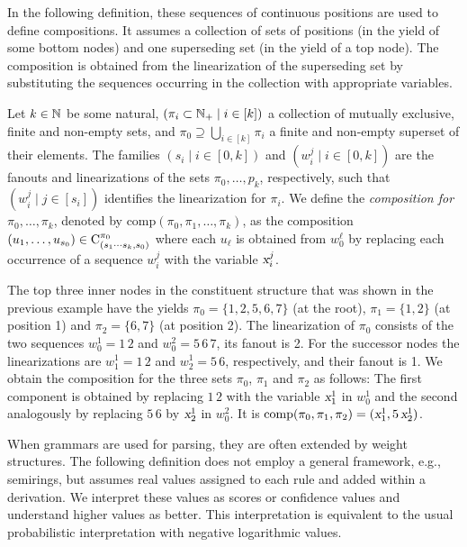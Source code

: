 \documentclass[../../document.tex]{subfiles}
\begin{document}
    In the following definition, these sequences of continuous positions are used to define  compositions.
    It assumes a collection of sets of positions (in the yield of some bottom nodes) and one superseding set (in the yield of a top node).
    The composition is obtained from the linearization of the superseding set by substituting the sequences occurring in the collection with appropriate variables.

    \begin{definition}
        Let \(k \in \mathbb{N}\) be some natural, \((\pi_i \subset \mathbb{N}_+ \mid i \in [k])\) a collection of mutually exclusive, finite and non-empty sets, and \(\pi_0 \supseteq \bigcup_{i \in [k]} \pi_i\) a finite and non-empty superset of their elements.
        The families \((s_i \mid i \in [0,k])\) and \((w_i^j \mid i \in [0,k])\) are the fanouts and linearizations of the sets \(\pi_0, \ldots, p_k\), respectively, such that \((w_i^j \mid j \in [s_i])\) identifies the linearization for \(\pi_i\).
        We define the \emph{composition for \(\pi_0, \ldots, \pi_k\)}, denoted by \(\mathrm{comp}(\pi_0, \pi_1, \ldots, \pi_k)\), as the composition \((u_1, \ldots, u_{s_0}) \in \mathrm{C}^{\pi_0}_{(s_1\cdots s_k, s_0)}\) where each \(u_\ell\) is obtained from \(w_0^\ell\) by replacing each occurrence of a sequence \(w_i^j\) with the variable \(\textsl{x}_i^j\).
    \end{definition}

    \begin{example}
        The top three inner nodes in the constituent structure that was shown in the previous example have the yields \(\pi_0 = \{1,2,5,6,7\}\) (at the root), \(\pi_1 = \{1,2\}\) (at position 1) and \(\pi_2 = \{6,7\}\) (at position 2).
        The linearization of \(\pi_0\) consists of the two sequences \(w_0^1 = 1\,2\) and \(w_0^2 = 5\,6\,7\), its fanout is 2.
        For the successor nodes the linearizations are \(w_1^1 = 1\,2\) and \(w_2^1 = 5\,6\), respectively, and their fanout is 1.
        We obtain the composition for the three sets \(\pi_0\), \(\pi_1\) and \(\pi_2\) as follows:
            The first component is obtained by replacing \(1\,2\) with the variable \(\textsl{x}_1^1\) in \(w_0^1\) and the second analogously by replacing \(5\,6\) by \(\textsl{x}_2^1\) in \(w_0^2\).
        It is \(\mathrm{comp}(\pi_0, \pi_1, \pi_2) = (\textsl{x}_1^1, 5\,\textsl{x}_2^1)\).
    \end{example}

    When grammars are used for parsing, they are often extended by weight structures.
    The following definition does not employ a general framework, e.g.\@, semirings, but assumes real values assigned to each rule and added within a derivation.
    We interpret these values as scores or confidence values and understand higher values as better.
    This interpretation is equivalent to the usual probabilistic interpretation \citep[cf.][Viterbi semiring]{Goodman} with negative logarithmic values.
\end{document}
